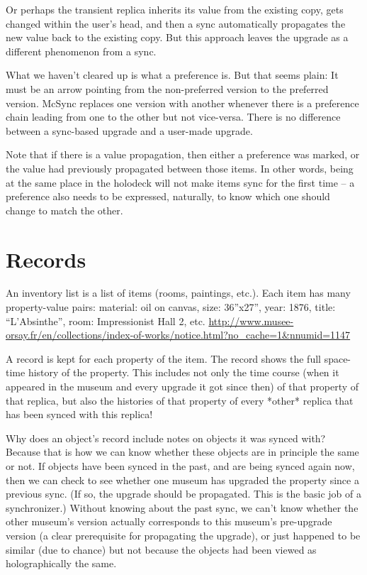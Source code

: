 \documentclass{book}
\begin{document}
Or perhaps the transient replica inherits its value from the existing copy, gets changed within the user's head, and then a sync automatically propagates the new value back to the existing copy.  But this approach leaves the upgrade as a different phenomenon from a sync.

What we haven't cleared up is what a preference is.  But that seems plain:  It must be an arrow pointing from the non-preferred version to the preferred version.  McSync replaces one version with another whenever there is a preference chain leading from one to the other but not vice-versa.  There is no difference between a sync-based upgrade and a user-made upgrade.

Note that if there is a value propagation, then either a preference was marked, or the value had previously propagated between those items.  In other words, being at the same place in the holodeck will not make items sync for the first time -- a preference also needs to be expressed, naturally, to know which one should change to match the other.
\section{Records}

An inventory list is a list of items (rooms, paintings, etc.).  Each item has many property-value pairs:  material: oil on canvas, size: 36''x27'', year: 1876, title: ``L'Absinthe'', room: Impressionist Hall 2, etc.  \url{http://www.musee-orsay.fr/en/collections/index-of-works/notice.html?no_cache=1&nnumid=1147}

A record is kept for each property of the item.  The record shows the full space-time history of the property.  This includes not only the time course (when it appeared in the museum and every upgrade it got since then) of that property of that replica, but also the histories of that property of every *other* replica that has been synced with this replica!

Why does an object's record include notes on objects it was synced with?  Because that is how we can know whether these objects are in principle the same or not.  If objects have been synced in the past, and are being synced again now, then we can check to see whether one museum has upgraded the property since a previous sync.  (If so, the upgrade should be propagated.  This is the basic job of a synchronizer.)  Without knowing about the past sync, we can't know whether the other museum's version actually corresponds to this museum's pre-upgrade version (a clear prerequisite for propagating the upgrade), or just happened to be similar (due to chance) but not because the objects had been viewed as holographically the same.
\end{document}
